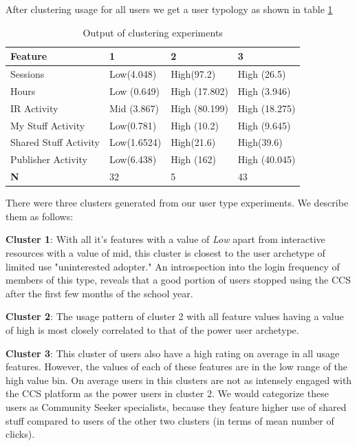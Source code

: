 \documentclass{acm_proc_article-sp}
\begin{document}
After clustering usage for all users we get a user typology as shown in table \ref{usertypology}
\begin{table}
\caption{Output of clustering experiments}
\label{usertypology}
\begin{tabular}{|p{3cm}|p{1.5cm}|p{1.5cm}|p{1.5cm}|}
\hline \textbf{Feature} & 1 &  2 & 3 \\ 
\hline Sessions & Low(4.048)& High(97.2)  & High (26.5)  \\ 
\hline Hours & Low (0.649) & High (17.802) & High (3.946)  \\ 
\hline IR Activity & Mid (3.867) & High (80.199) & High (18.275) \\ 
\hline My Stuff Activity &  Low(0.781)  & High (10.2) & High (9.645)  \\ 
\hline Shared Stuff Activity & Low(1.6524) & High(21.6) & High(39.6) \\
\hline Publisher Activity & Low(6.438) & High (162) & High (40.045)  \\
\hline \textbf{N} & 32 & 5 & 43

\end{tabular}
\end{table} 

There were three clusters generated from our user type experiments. We describe them as follows:

\textbf{Cluster 1}: With all it's features with a value of \textit{Low} apart from interactive resources with a value of mid, this cluster is closest to the user archetype of limited use "uninterested adopter." An introspection into the login frequency of members of this type, reveals that a good portion of users stopped using the CCS after the first few months of the school year.

\textbf{Cluster 2}: The usage pattern of cluster 2 with all feature values having a value of high is most closely correlated to that of the power user archetype.

\textbf{Cluster 3}: This cluster of users also have a high rating on average in all usage features. However, the values of each of these features are in the low range of the high value bin. On average users in this clusters are not as intensely engaged with the CCS platform as the power users in cluster 2. We would categorize these users as Community Seeker specialists, because they feature higher use of shared stuff compared to users of the other two clusters (in terms of mean number of clicks).
\end{document}
